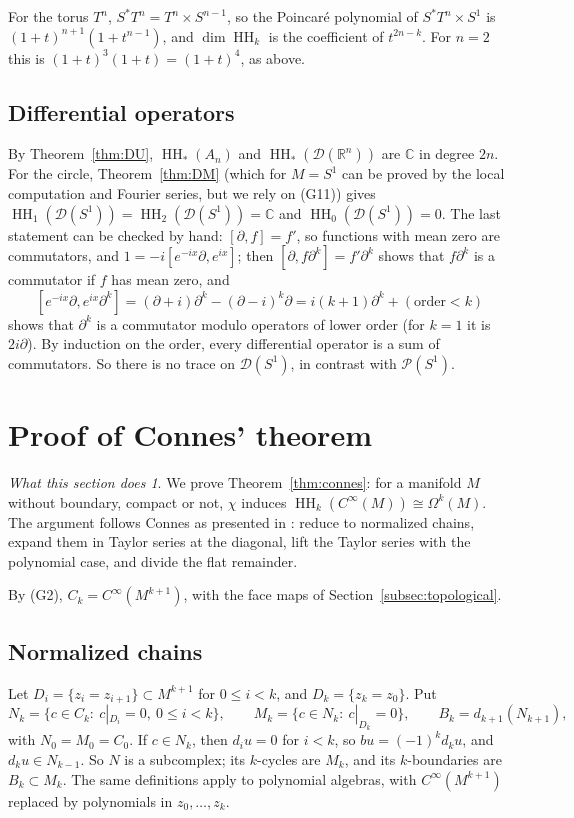 \documentclass[11pt,oneside,reqno]{article}
\DeclareMathOperator{\HH}{HH}
\newcommand{\C}{\mathbb C}
\newcommand{\R}{\mathbb R}
\newcommand{\cD}{\mathcal D}
\newcommand{\cP}{\mathcal P}
\newcommand{\CI}{C^\infty}
\newcommand{\Om}{\Omega}
\newcommand{\pa}{\partial}
\theoremstyle{plain}
\theoremstyle{definition}
\theoremstyle{remark}
\newtheorem*{whatdoes}{What this section does}
\begin{document}
For the torus \(T^n\), \(S^*T^n=T^n\times S^{n-1}\), so the Poincaré polynomial of \(S^*T^n\times S^1\) is
\((1+t)^{n+1}(1+t^{n-1})\), and \(\dim\HH_k\) is the coefficient of \(t^{2n-k}\). For \(n=2\) this is
\((1+t)^3(1+t)=(1+t)^4\), as above.

\subsection{Differential operators}\label{subsec:exD}
By Theorem~\ref{thm:DU}, \(\HH_*(A_n)\) and \(\HH_*(\cD(\R^n))\) are \(\C\) in degree \(2n\). For the circle,
Theorem~\ref{thm:DM} (which for \(M=S^1\) can be proved by the local computation and
Fourier series, but we rely on (G11)) gives \(\HH_1(\cD(S^1))=\HH_2(\cD(S^1))=\C\) and \(\HH_0(\cD(S^1))=0\).
The last statement can be checked by hand: \([\pa,f]=f'\), so functions with mean zero
are commutators, and \(1=-i[e^{-ix}\pa,e^{ix}]\); then \([\pa,f\pa^k]=f'\pa^k\) shows that \(f\pa^k\) is a commutator if \(f\) has mean zero, and
\[
 [e^{-ix}\pa,e^{ix}\pa^k]=(\pa+i)\pa^k-(\pa-i)^k\pa=i(k+1)\pa^k+(\text{order}<k)
\]
shows that \(\pa^k\) is a commutator modulo operators of lower order (for \(k=1\) it is
\(2i\pa\)). By induction on the order, every differential operator is a sum of
commutators.
So there is no trace on \(\cD(S^1)\), in contrast with \(\cP(S^1)\).

\appendix

\section{Proof of Connes' theorem}\label{app:connes}

\begin{whatdoes}
We prove Theorem~\ref{thm:connes}: for a manifold \(M\) without boundary, compact or
not, \(\chi\) induces \(\HH_k(\CI(M))\cong\Om^k(M)\). The argument follows Connes
\cite{Connes} as presented in \cite[Ch.~10]{MelroseMicro}: reduce to normalized
chains, expand them in Taylor series at the diagonal, lift the Taylor series with
the polynomial case, and divide the flat remainder.
\end{whatdoes}

By (G2), \(C_k=\CI(M^{k+1})\), with the face maps of Section~\ref{subsec:topological}.

\subsection{Normalized chains}
Let \(D_i=\{z_i=z_{i+1}\}\subset M^{k+1}\) for \(0\le i<k\), and \(D_k=\{z_k=z_0\}\). Put
\[
 N_k=\{c\in C_k:\ c|_{D_i}=0,\ 0\le i<k\},\qquad M_k=\{c\in N_k:\ c|_{D_k}=0\},\qquad
 B_k=d_{k+1}(N_{k+1}),
\]
with \(N_0=M_0=C_0\). If \(c\in N_k\), then \(d_iu=0\) for \(i<k\), so \(bu=(-1)^kd_ku\), and \(d_ku\in N_{k-1}\). So
\(N\) is a subcomplex; its \(k\)-cycles are \(M_k\), and its \(k\)-boundaries are \(B_k\subset M_k\).
The same definitions apply to polynomial algebras, with \(\CI(M^{k+1})\) replaced by
polynomials in \(z_0,\dots,z_k\).
\end{document}
